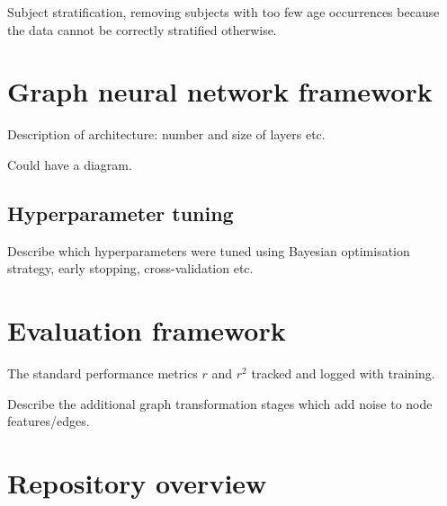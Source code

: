 Subject stratification, removing subjects with too few age occurrences because the data cannot be correctly stratified otherwise.


\section{Graph neural network framework}
Description of architecture: number and size of layers etc.

Could have a diagram.

\subsection{Hyperparameter tuning}
Describe which hyperparameters were tuned using Bayesian optimisation strategy, early stopping, cross-validation etc.


\section{Evaluation framework}
The standard performance metrics $r$ and $r^2$ tracked and logged with training.

Describe the additional graph transformation stages which add noise to node features/edges.


\section{Repository overview}

